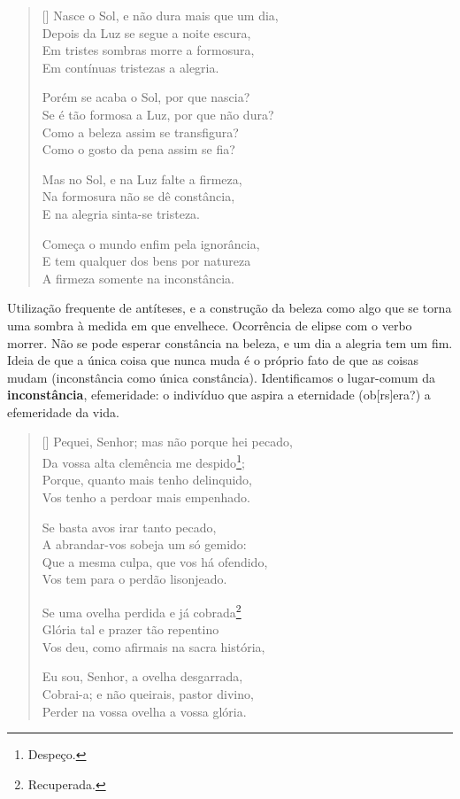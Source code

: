 \documentclass[12pt]{book}
\begin{document}
			\begin{verse}[\versewidth]
				Nasce o Sol, e não dura mais que um dia, \\
				Depois da Luz se segue a noite escura, \\
				Em tristes sombras morre a formosura, \\
				Em contínuas tristezas a alegria.
				
				Porém se acaba o Sol, por que nascia? \\
				Se é tão formosa a Luz, por que não dura? \\
				Como a beleza assim se transfigura? \\
				Como o gosto da pena assim se fia?
				
				Mas no Sol, e na Luz falte a firmeza, \\
				Na formosura não se dê constância, \\
				E na alegria sinta-se tristeza.
				
				Começa o mundo enfim pela ignorância, \\
				E tem qualquer dos bens por natureza \\
				A firmeza somente na inconstância. \\
			\end{verse}
			\par Utilização frequente de antíteses, e a construção da beleza como algo que se torna uma sombra à medida em que envelhece. Ocorrência de elipse com o verbo morrer. Não se pode esperar constância na beleza, e um dia a alegria tem um fim. Ideia de que a única coisa que nunca muda é o próprio fato de que as coisas mudam (inconstância como única constância). Identificamos o lugar-comum da \textbf{inconstância}, efemeridade: o indivíduo que aspira a eternidade (ob[rs]era?) a efemeridade da vida.
			\settowidth{\versewidth}{Da vossa alta clemência me despido}
			\begin{verse}[\versewidth]
				Pequei, Senhor; mas não porque hei pecado, \\
				Da vossa alta clemência me despido\footnote{Despeço.}; \\
				Porque, quanto mais tenho delinquido, \\
				Vos tenho a perdoar mais empenhado.
				
				Se basta avos irar tanto pecado, \\
				A abrandar-vos sobeja um só gemido: \\
				Que a mesma culpa, que vos há ofendido, \\
				Vos tem para o perdão lisonjeado.
				
				Se uma ovelha perdida e já cobrada\footnote{Recuperada.} \\
				Glória tal e prazer tão repentino \\
				Vos deu, como afirmais na sacra história, 
				
				Eu sou, Senhor, a ovelha desgarrada, \\
				Cobrai-a; e não queirais, pastor divino, \\
				Perder na vossa ovelha a vossa glória. \\
			\end{verse}
\end{document}
